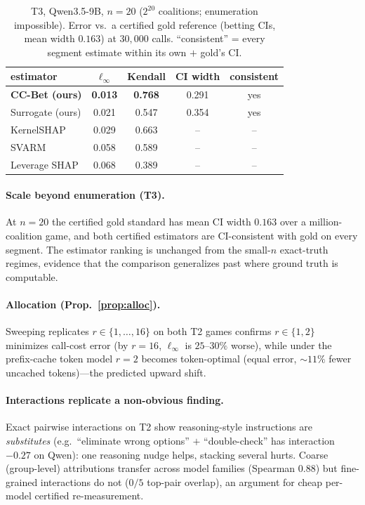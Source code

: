 \documentclass[10pt,twocolumn,letterpaper]{article}
\theoremstyle{plain}
\theoremstyle{definition}
\begin{document}
\begin{table}[t]
\centering\small
\caption{T3, Qwen3.5-9B, $n{=}20$ ($2^{20}$ coalitions; enumeration impossible).
Error vs.\ a certified gold reference (betting CIs, mean width $0.163$) at
$30{,}000$ calls. ``consistent'' = every segment estimate within its own $+$
gold's CI.}
\label{tab:t3}
\begin{tabular}{lcccc}
\toprule
estimator & $\ell_\infty$ & Kendall & CI width & consistent \\
\midrule
\textbf{CC-Bet (ours)} & \textbf{0.013} & \textbf{0.768} & 0.291 & yes \\
Surrogate (ours)       & 0.021 & 0.547 & 0.354 & yes \\
KernelSHAP             & 0.029 & 0.663 & --    & --  \\
SVARM                  & 0.058 & 0.589 & --    & --  \\
Leverage SHAP          & 0.068 & 0.389 & --    & --  \\
\bottomrule
\end{tabular}
\end{table}

\paragraph{Scale beyond enumeration (T3).} At $n{=}20$ the certified gold
standard has mean CI width $0.163$ over a million-coalition game, and both
certified estimators are CI-consistent with gold on every segment. The estimator
ranking is unchanged from the small-$n$ exact-truth regimes, evidence that the
comparison generalizes past where ground truth is computable.

\paragraph{Allocation (Prop.~\ref{prop:alloc}).} Sweeping replicates
$r\in\{1,\dots,16\}$ on both T2 games confirms $r\!\in\!\{1,2\}$ minimizes
call-cost error (by $r{=}16$, $\ell_\infty$ is $25$--$30\%$ worse), while under
the prefix-cache token model $r{=}2$ becomes token-optimal (equal error, $\sim
11\%$ fewer uncached tokens)---the predicted upward shift.

\paragraph{Interactions replicate a non-obvious finding.} Exact pairwise
interactions on T2 show reasoning-style instructions are \emph{substitutes}
(e.g.\ ``eliminate wrong options'' $+$ ``double-check'' has interaction $-0.27$
on Qwen): one reasoning nudge helps, stacking several hurts. Coarse (group-level)
attributions transfer across model families (Spearman $0.88$) but fine-grained
interactions do not ($0/5$ top-pair overlap), an argument for cheap per-model
certified re-measurement.
\end{document}
